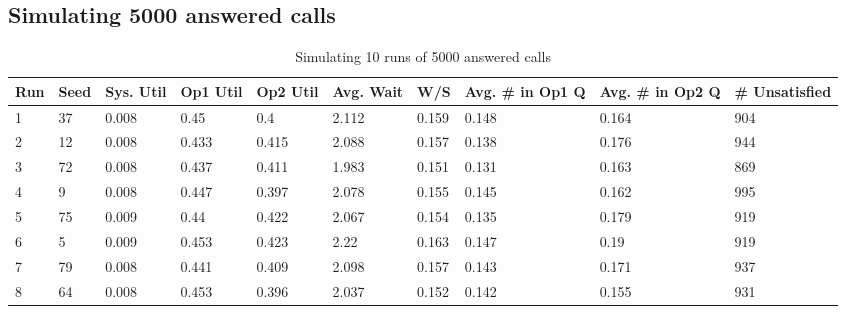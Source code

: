 \documentclass{article}
\begin{document}
\subsection{Simulating 5000 answered calls}

\begin{table}[H]
    \tiny
    \centering
    \caption{Simulating 10 runs of 5000 answered calls}
    \begin{tabular}{@{}llllllllll@{}}
        \toprule
        \textbf{Run} & \textbf{Seed} & \textbf{Sys. Util} & \textbf{Op1 Util} & \textbf{Op2 Util} & \textbf{Avg. Wait} & \textbf{W/S} & \textbf{Avg. \# in Op1 Q} & \textbf{Avg. \# in Op2 Q} & \textbf{\# Unsatisfied} \\ \midrule
        1            & 37            & 0.008              & 0.45              & 0.4               & 2.112              & 0.159        & 0.148                     & 0.164                     & 904                     \\
        2            & 12            & 0.008              & 0.433             & 0.415             & 2.088              & 0.157        & 0.138                     & 0.176                     & 944                     \\
        3            & 72            & 0.008              & 0.437             & 0.411             & 1.983              & 0.151        & 0.131                     & 0.163                     & 869                     \\
        4            & 9             & 0.008              & 0.447             & 0.397             & 2.078              & 0.155        & 0.145                     & 0.162                     & 995                     \\
        5            & 75            & 0.009              & 0.44              & 0.422             & 2.067              & 0.154        & 0.135                     & 0.179                     & 919                     \\
        6            & 5             & 0.009              & 0.453             & 0.423             & 2.22               & 0.163        & 0.147                     & 0.19                      & 919                     \\
        7            & 79            & 0.008              & 0.441             & 0.409             & 2.098              & 0.157        & 0.143                     & 0.171                     & 937                     \\
        8            & 64            & 0.008              & 0.453             & 0.396             & 2.037              & 0.152        & 0.142                     & 0.155                     & 931                     \\

\end{tabular}
\end{table}
\end{document}
